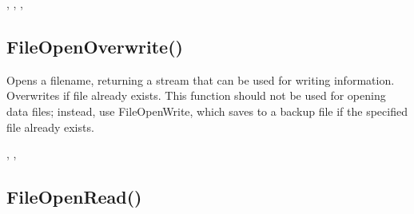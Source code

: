 \documentclass[letterpaper,10pt,english]{sphinxmanual}
\begin{document}
\sphinxAtStartPar
{}

\sphinxAtStartPar
{}, , ,  

\ignorespaces 

\subsection{FileOpenOverwrite()}
\label{\detokenize{reference/peblstream:fileopenoverwrite}}\label{\detokenize{reference/peblstream:index-11}}
\sphinxAtStartPar
{}

\sphinxAtStartPar
{}

\sphinxAtStartPar
Opens a filename, returning a stream that can be   used for writing information.  Overwrites if file already exists.   This function should not be used for opening data files; instead,   use FileOpenWrite, which saves to a backup file if the specified   file already exists.

\sphinxAtStartPar
{}

\begin{sphinxVerbatim}[commandchars=\\\{\}]
\end{sphinxVerbatim}

\sphinxAtStartPar
{}

\sphinxAtStartPar
{}, ,   

\ignorespaces 

\subsection{FileOpenRead()}
\label{\detokenize{reference/peblstream:fileopenread}}\label{\detokenize{reference/peblstream:index-12}}
\sphinxAtStartPar
{}
\end{document}
